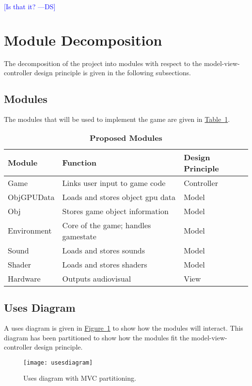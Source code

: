 \documentclass[12pt, titlepage]{article}
\newcommand{\authornote}[3]{\textcolor{#1}{[#3 ---#2]}}
\newcommand{\authornote}[3]{}
\newcommand{\ds}[1]{\authornote{blue}{DS}{#1}}
\begin{document}
\ds{Is that it?}

\section{Module Decomposition}
The decomposition of the project into modules with respect to the model-view-controller design principle is given in the following subsections.

\subsection{Modules}
The modules that will be used to implement the game are given in \hyperref[tab:modules]{Table~\ref*{tab:modules}}.  

\begin{table}[h]
\caption{\bf Proposed Modules} \label{tab:modules}
\begin{tabularx}{\textwidth}{p{3cm}p{6cm}X}
\toprule {\bf Module} & {\bf Function} & {\bf Design Principle}\\
\midrule
Game & Links user input to game code & Controller\\
ObjGPUData & Loads and stores object gpu data & Model\\
Obj & Stores game object information & Model\\
Environment & Core of the game; handles gamestate & Model\\
Sound & Loads and stores sounds & Model\\
Shader & Loads and stores shaders & Model\\
Hardware & Outputs audiovisual & View\\
\bottomrule
\end{tabularx}
\end{table}


\subsection{Uses Diagram}
A uses diagram is given in \hyperref[fig:usesdiagram]{Figure~\ref*{fig:usesdiagram}} to show how the modules will interact.  This diagram has been partitioned to show how the modules fit the model-view-controller design principle.
\begin{figure}[hTB]
\begin{center}
\texttt{[image: usesdiagram]}
\caption{Uses diagram with MVC partitioning.} \label{fig:usesdiagram}
\end{center}
\end{figure}
\end{document}
